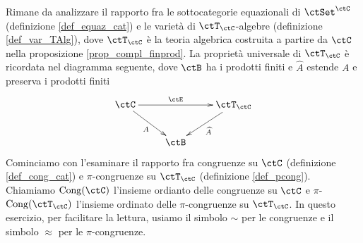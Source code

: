 \begin{exercise}\label{esercizio_var_pref_alg}
 Rimane da analizzare il rapporto fra le sottocategorie equazionali di \(\ctSet^\ctC\) (definizione \ref{def_equaz_cat}) e le varietà
 di \(\ctT_\ctC\)-algebre (definizione \ref{def_var_TAlg}), dove \(\ctT_\ctC\) è la teoria algebrica costruita a partire da \(\ctC\) nella
 proposizione \ref{prop_compl_finprod}. La proprietà universale di \(\ctT_\ctC\) è ricordata nel diagramma seguente, dove
 \(\ctB\) ha i prodotti finiti e \(\widehat{A}\) estende \(A\) e preserva i prodotti finiti
 \[\xymatrix{\ctC \ar[rr]^-{\ctE} \ar[rd]_{A} & & \ctT_\ctC \ar[ld]^{\widehat{A}} \\ & \ctB }\]
 Cominciamo con l'esaminare il rapporto fra congruenze su \(\ctC\) (definizione \ref{def_cong_cat})
 e \(\pi\)-congruenze su \(\ctT_\ctC\) (definizione \ref{def_pcong}). Chiamiamo \(\mathrm{Cong}(\ctC)\) l'insieme ordianto delle
 congruenze su \(\ctC\) e \(\pi\)-\(\mathrm{Cong}(\ctT_\ctC)\) l'insieme ordinato delle \(\pi\)-congruenze su \(\ctT_\ctC\).
 In questo esercizio, per facilitare la lettura, usiamo il simbolo \(\sim\) per le congruenze e il simbolo \(\approx\) per le \(\pi\)-congruenze.
\end{exercise}
